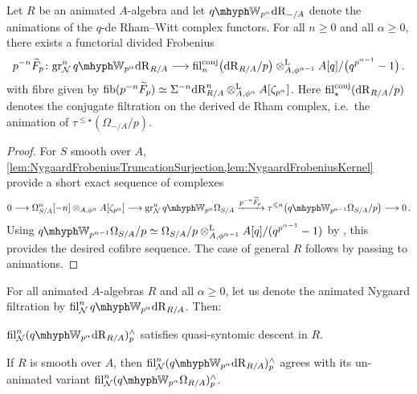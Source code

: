 \documentclass[DIV=12,numbers=enddot,leqno,bibliography=totoc]{scrartcl}
\begin{document}
	\begin{cor}\label{cor:NygaardCofibreSequence}
		Let $R$ be an animated $A$-algebra and let $\qIW_{p^\alpha}\deRham_{-/A}$ denote the  animations of the $q$-de Rham--Witt complex functors. For all $n\geqslant 0$ and all $\alpha\geqslant 0$, there exists a functorial divided Frobenius
		\begin{equation*}
			p^{-n}\overtilde{F}_p\colon  \gr_\Nn^n\qIW_{p^\alpha}\deRham_{R/A}\longrightarrow  \fil_n^\mathrm{conj}\bigl(\deRham_{R/A}/p\bigr)\lotimes_{A,\phi^{\alpha-1}}A[q]/\bigl(q^{p^{{\alpha-1}}}-1\bigr)\,.
		\end{equation*}
		with fibre given by $\fib(p^{-n}\overtilde{F}_p)\simeq \Sigma^{-n}\deRham_{R/A}^n\lotimes_{A,\phi^\alpha}A[\zeta_{p^\alpha}]$. Here $ \operatorname{fil}_\star ^\mathrm{conj}(\mathrm{dR}_{R/A}/p)$ denotes the conjugate filtration on the derived de Rham complex, i.e.\ the animation of $\tau^{\leqslant \star}(\Omega_{-/A}/p)$.
	\end{cor}
	\begin{proof}
		For $S$ smooth over $A$, \cref{lem:NygaardFrobeniusTruncationSurjection,lem:NygaardFrobeniusKernel} provide a short exact sequence of complexes
		\begin{equation*}
			0\longrightarrow \Omega_{S/A}^n[-n]\otimes_{A,\phi^\alpha}A[\zeta_{p^\alpha}]\longrightarrow \gr_\Nn^n\qIW_{p^\alpha}\Omega_{S/A}\xrightarrow{p^{-n}\overtilde{F}_p}\tau^{\leqslant n}\left(\qIW_{p^{\alpha-1}}\Omega_{S/A}/p\right)\longrightarrow 0\,.
		\end{equation*}
		Using $\qIW_{p^{\alpha-1}}\Omega_{S/A}/p\simeq \Omega_{S/A}/p\lotimes_{A,\phi^{\alpha-1}}A[q]/(q^{p^{\alpha-1}}-1)$ by \cite[Proposition~]{qWitt}, this provides the desired cofibre sequence. The case of general $R$ follows by passing to animations.
	\end{proof}
	\begin{cor}\label{cor:NygaardQuasisyntomicDescent}
		For all animated $A$-algebras $R$ and all $\alpha\geqslant 0$, let us denote the animated Nygaard filtration by $ \fil_\Nn^n\qIW_{p^\alpha}\deRham_{R/A}$. Then:
		\begin{alphanumerate}
			\item $ \fil_\Nn^n(\qIW_{p^\alpha}\deRham_{R/A})_p^\complete$ satisfies quasi-syntomic descent in $R$.\label{enum:NygaardQuasisyntomicDescent}
			\item If $R$ is smooth over $A$, then $ \fil_\Nn^n(\qIW_{p^\alpha}\deRham_{R/A})_p^\complete$ agrees with its un-animated variant $\fil_\Nn^n(\qIW_{p^\alpha}\Omega_{R/A})_p^\complete$.\label{enum:NygaardSmooth}
		\end{alphanumerate}
	\end{cor}
\end{document}
